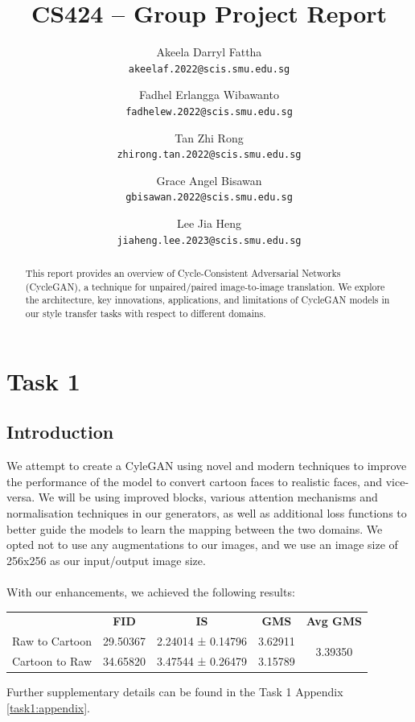 \documentclass[twoside,english,notitlepage]{report}
\title{CS424 – Group Project Report}
\author{
    Akeela Darryl Fattha\\
    \texttt{akeelaf.2022@scis.smu.edu.sg}
    \and
    Fadhel Erlangga Wibawanto\\
    \texttt{fadhelew.2022@scis.smu.edu.sg}
    \and
    Tan Zhi Rong\\
    \texttt{zhirong.tan.2022@scis.smu.edu.sg}
    \and
    Grace Angel Bisawan \\
    \texttt{gbisawan.2022@scis.smu.edu.sg}
    \and
    Lee Jia Heng\\
    \texttt{jiaheng.lee.2023@scis.smu.edu.sg}
}
\begin{document}
\date{}
\maketitle
\begin{abstract}
\noindent This report provides an overview of Cycle-Consistent Adversarial Networks (CycleGAN), a technique for unpaired/paired image-to-image translation. We explore the architecture, key innovations, applications, and limitations of CycleGAN models in our style transfer tasks with respect to different domains.
\end{abstract}
\tableofcontents


\chapter{Task 1}

\section{Introduction}
We attempt to create a CyleGAN using novel and modern techniques to improve the performance of the model to convert cartoon faces to realistic faces, and vice-versa. We will be using improved blocks, various attention mechanisms and normalisation techniques in our generators, as well as additional loss functions to better guide the models to learn the mapping between the two domains. We opted not to use any augmentations to our images, and we use an image size of 256x256 as our input/output image size. \\\\
With our enhancements, we achieved the following results:

\begin{table}[h]
    \centering
    \begin{tabular}{|l|c|c|c|c|}
    \hline
    \textbf{} & \textbf{FID} & \textbf{IS} & \textbf{GMS} & \textbf{Avg GMS} \\
    \cline{1-5}
    Raw to Cartoon     & 29.50367     & 2.24014 ± 0.14796   & 3.62911    & \multirow{2}{*}{3.39350} \\
    Cartoon to Raw     & 34.65820     & 3.47544 ± 0.26479   & 3.15789    &            \\
    \hline
    \end{tabular}
\end{table}

\noindent Further supplementary details can be found in the Task 1 Appendix \ref{task1:appendix}.
\end{document}
